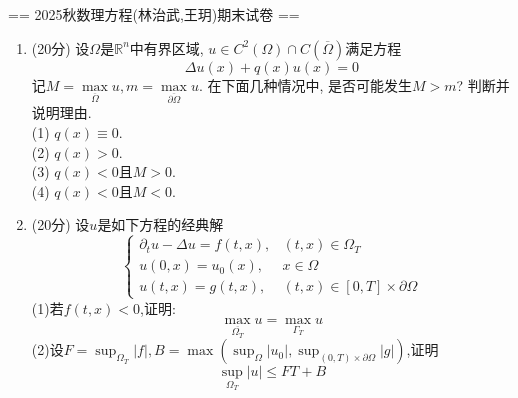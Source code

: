 == 2025秋数理方程(林治武,王玥)期末试卷 ==
\begin{enumerate}
\item (20分) 设$\Omega$是$\mathbb{R}^n$中有界区域, $u\in C^2(\Omega)\cap C(\overline{\Omega})$满足方程
\begin{equation*}
    \Delta u(x)+q(x)u(x)=0
\end{equation*}
记$M=\max\limits_{\overline{\Omega}}u,m=\max\limits_{\overline{\partial\Omega}}u$. 在下面几种情况中, 是否可能发生$M>m$? 判断并说明理由.\\
(1) $q(x)\equiv 0$.\\
(2) $q(x)>0$.\\
(3) $q(x)<0$且$M>0$.\\
(4) $q(x)<0$且$M<0$.

\item (20分) 设$u$是如下方程的经典解
\begin{equation*}
    \begin{cases}
     \partial_t u-\Delta u=f(t,x),& (t,x)\in \Omega_{T}\\
     u(0,x)=u_0(x),& x\in \Omega \\
     u(t,x)=g(t,x),&(t,x)\in [0,T] \times \partial \Omega
    \end{cases}
\end{equation*}
(1)若$f(t,x)<0$,证明:
\begin{equation*}
    \max_{\overline{\Omega_T}} u=\max_{\Gamma_T} u
\end{equation*}
(2)设$F=\displaystyle \sup_{\Omega_T}|f|,B=\displaystyle \max{\left(\sup_{\Omega}|u_0|,\sup_{(0,T)\times \partial \Omega }|g|\right)}$,证明
\begin{equation*}
    \sup_{\Omega_T}|u| \leq FT+B
\end{equation*}


\end{enumerate}
